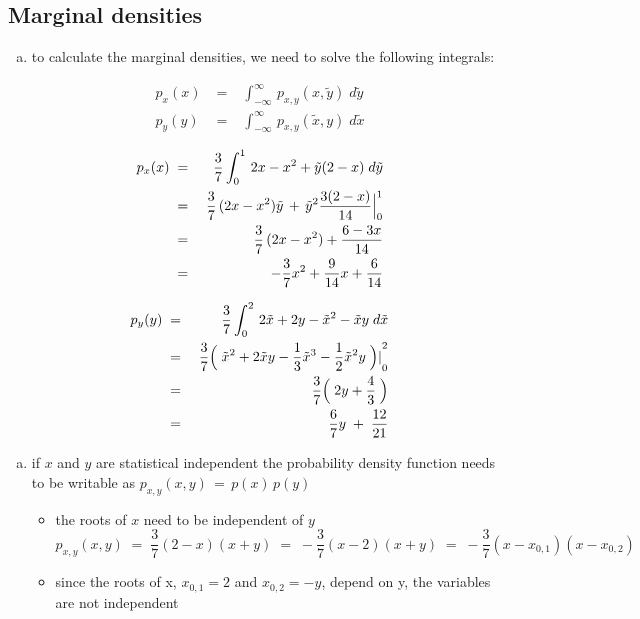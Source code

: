 \documentclass[11pt,a4paper]{article}
\begin{document}
\subsection{Marginal densities}

\begin{enumerate}[a)]
\item to calculate the marginal densities, we need to solve the following integrals:
\end{enumerate}
  \begin{eqnarray}
p_x(x)&\;=\;& \int_{-\infty}^{\infty} \,p_{x,y}(x,\tilde{y})\;d\tilde{y} \\
p_y(y)&\;=\;& \int_{-\infty}^{\infty} \,p_{x,y}(\tilde{x},y)\;d\tilde{x}
  \end{eqnarray}

  \begin{eqnarray}
p_x(x)&\;=\;& \frac{3}{7}\int_{0}^{1} \,2x-x^2+\tilde{y}(2-x)\;d\tilde{y} \\
&\;=\;& \frac{3}{7}\,(2x-x^2)\tilde{y}\,+\,\tilde{y}^2\frac{3(2-x)}{14} \Big{\vert}_0^1\\
&\;=\;& \frac{3}{7}\,(2x-x^2)+\frac{6-3x}{14}\\
&\;=\;& -\frac{3}{7}x^2 + \frac{9}{14}x + \frac{6}{14}
  \end{eqnarray}

  \begin{eqnarray}
p_y(y)&\;=\;& \frac{3}{7}\int_{0}^{2} \,2\tilde{x}+2y-\tilde{x}^2-\tilde{x}y\;d\tilde{x} \\
&\;=\;& \frac{3}{7}\Big{(}\;\tilde{x}^2+2\tilde{x}y-\frac{1}{3}\tilde{x}^3-\frac{1}{2}\tilde{x}^2y\;\Big{) \vert}_0^2 \\
&\;=\;& \frac{3}{7}\Big{(}\;2y+\frac{4}{3}\;\Big{)}\\
&\;=\;& \frac{6}{7}y\;+\;\frac{12}{21}
  \end{eqnarray}


\begin{enumerate}[b)]

\item if $x$ and $y$ are statistical independent the probability density function needs to be writable as $p_{x,y}(x,y)\,=\, p(x)\,p(y)$
\begin{itemize}
\item the roots of $x$ need to be independent of $y$
\begin{equation}
p_{x,y}(x,y)\;=\; \frac{3}{7}(2-x)(x+y)\;=\;-\frac{3}{7}(x-2)(x+y)\;=\;-\frac{3}{7}(x-x_{0,1})(x-x_{0,2})
\end{equation}
\item since the roots of x, $x_{0,1}=2$ and $x_{0,2}=-y$, depend on y, the variables are not independent
\end{itemize}
\end{enumerate}
\end{document}

